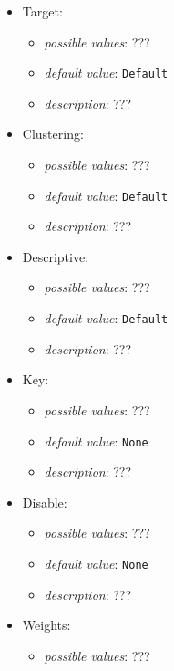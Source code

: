 \documentclass{article}
\begin{document}
\begin{itemize}
    \item Target:
           \begin{itemize}
                \item \emph{possible values}: ???
                \item \emph{default value}: \texttt{Default}
                \item \emph{description}: ???
           \end{itemize}
    \item Clustering:
           \begin{itemize}
                \item \emph{possible values}: ???
                \item \emph{default value}: \texttt{Default}
                \item \emph{description}: ???
           \end{itemize}
    \item Descriptive:
           \begin{itemize}
                \item \emph{possible values}: ???
                \item \emph{default value}: \texttt{Default}
                \item \emph{description}: ???
           \end{itemize}
    \item Key:
           \begin{itemize}
                \item \emph{possible values}: ???
                \item \emph{default value}: \texttt{None}
                \item \emph{description}: ???
           \end{itemize}
    \item Disable:
           \begin{itemize}
                \item \emph{possible values}: ???
                \item \emph{default value}: \texttt{None}
                \item \emph{description}: ???
           \end{itemize}
    \item Weights:
           \begin{itemize}
                \item \emph{possible values}: ???

\end{itemize}
\end{itemize}
\end{document}
